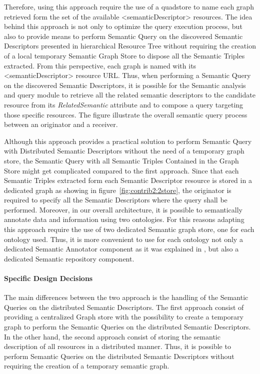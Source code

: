 Therefore, using this approach require the use of a quadstore to name each graph retrieved form the set of the available <semanticDescriptor> resources. The idea behind this approach is not only to optimize the query execution process, but also to provide means to perform Semantic Query on the discovered Semantic Descriptors presented in hierarchical Resource Tree without requiring the creation of a local temporary Semantic Graph Store to dispose all the Semantic Triples extracted. From this perspective, each graph is named with its <semanticDescriptor> resource URL. Thus, when performing a Semantic Query on the discovered Semantic Descriptors, it is possible for the Semantic analysis and query module to retrieve all the related semantic descriptors to the candidate resource from its \textit{RelatedSemantic} attribute and to compose a query targeting those specific resources. The figure illustrate the overall semantic query process between an originator and a receiver.

Although this approach provides a practical solution to perform Semantic Query with Distributed Semantic Descriptors without the need of a temporary graph store, the Semantic Query with all Semantic Triples Contained in the Graph Store might get complicated compared to the first approach. Since that each Semantic Triples extracted form each Semantic Descriptor resource is stored in a dedicated graph as showing in figure~\ref{fig:contrib2:2store}, the originator is required to specify all the Semantic Descriptors where the query shall be performed. Moreover, in our overall architecture, it is possible to semantically annotate data and information using two ontologies. For this reasons adapting this approach require the use of two dedicated Semantic graph store, one for each ontology used. Thus, it is more convenient to use for each ontology not only a dedicated Semantic Annotator component as it was explained in , but also a dedicated Semantic repository component.

\paragraph{Specific Design Decisions }
The main differences between the two approach is the handling of the Semantic Queries on the distributed Semantic Descriptors. The first approach consist of providing a centralized Graph store with the possibility to create a temporary graph to perform the Semantic Queries on the distributed Semantic Descriptors. In the other hand, the second approach consist of storing the semantic description of all resources in a distributed manner. Thus, it is possible to perform Semantic Queries on the distributed Semantic Descriptors without requiring the creation of a temporary semantic graph.\par 

